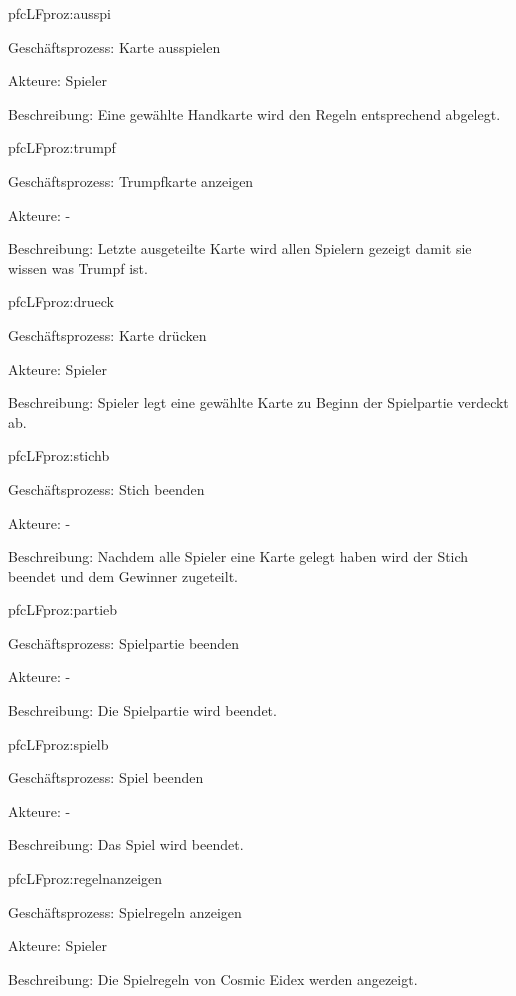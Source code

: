 \begin{description}[leftmargin=5em, style=sameline]
	\begin{lhp}{pfc}{LF}{proz:ausspi}
		\item [Geschäftsprozess:] Karte ausspielen
		\item [Akteure:] Spieler
		\item [Beschreibung:] Eine gewählte Handkarte wird den Regeln entsprechend abgelegt.
	\end{lhp}

	\begin{lhp}{pfc}{LF}{proz:trumpf}
		\item [Geschäftsprozess:] Trumpfkarte anzeigen
		\item [Akteure:] -
		\item [Beschreibung:] Letzte ausgeteilte Karte wird allen Spielern gezeigt damit sie wissen was Trumpf ist.
	\end{lhp}
	
	\begin{lhp}{pfc}{LF}{proz:drueck}
		\item [Geschäftsprozess:] Karte drücken
		\item [Akteure:] Spieler
		\item [Beschreibung:] Spieler legt eine gewählte Karte zu Beginn der Spielpartie verdeckt ab.
	\end{lhp}						

	\begin{lhp}{pfc}{LF}{proz:stichb}
		\item [Geschäftsprozess:] Stich beenden
		\item [Akteure:] -
		\item [Beschreibung:] Nachdem alle Spieler eine Karte gelegt haben wird der Stich beendet und dem Gewinner zugeteilt.
	\end{lhp}
	
	\begin{lhp}{pfc}{LF}{proz:partieb}
		\item [Geschäftsprozess:] Spielpartie beenden
		\item [Akteure:] -
		\item [Beschreibung:] Die Spielpartie wird beendet.
	\end{lhp}

	\begin{lhp}{pfc}{LF}{proz:spielb}
		\item [Geschäftsprozess:] Spiel beenden
		\item [Akteure:] -
		\item [Beschreibung:] Das Spiel wird beendet.
	\end{lhp}
	
	\begin{lhp}{pfc}{LF}{proz:regelnanzeigen}
		\item [Geschäftsprozess:] Spielregeln anzeigen
		\item [Akteure:] Spieler
		\item [Beschreibung:] Die Spielregeln von Cosmic Eidex werden angezeigt.
	\end{lhp}

\end{description}
